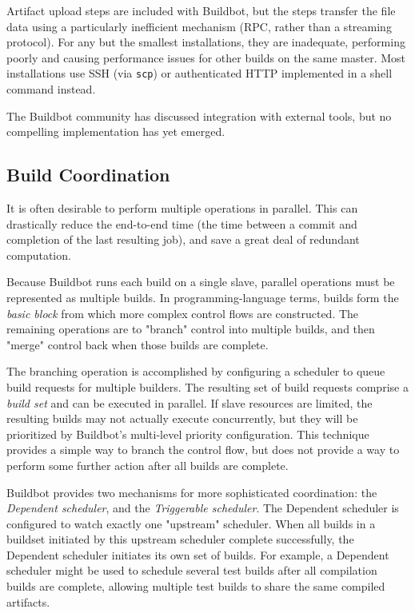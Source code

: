 \documentclass[conference]{IEEEtran}
\begin{document}
Artifact upload steps are included with Buildbot, but the steps transfer the file data using a particularly inefficient mechanism (RPC, rather than a streaming protocol).
For any but the smallest installations, they are inadequate, performing poorly and causing performance issues for other builds on the same master.
Most installations use SSH (via {\tt scp}) or authenticated HTTP implemented in a shell command instead.

The Buildbot community has discussed integration with external tools\cite{pull547}, but no compelling implementation has yet emerged.

\subsection{Build Coordination}

It is often desirable to perform multiple operations in parallel.
This can drastically reduce the end-to-end time (the time between a commit and completion of the last resulting job), and save a great deal of redundant computation.

Because Buildbot runs each build on a single slave, parallel operations must be represented as multiple builds.
In programming-language terms, builds form the \emph{basic block} from which more complex control flows are constructed.
The remaining operations are to "branch" control into multiple builds, and then "merge" control back when those builds are complete.

The branching operation is accomplished by configuring a scheduler to queue build requests for multiple builders.
The resulting set of build requests comprise a \emph{build set} and can be executed in parallel.
If slave resources are limited, the resulting builds may not actually execute concurrently, but they will be prioritized by Buildbot's multi-level priority configuration.
This technique provides a simple way to branch the control flow, but does not provide a way to perform some further action after all builds are complete.

Buildbot provides two mechanisms for more sophisticated coordination: the \emph{Dependent scheduler}, and the \emph{Triggerable scheduler}.
The Dependent scheduler is configured to watch exactly one "upstream" scheduler.
When all builds in a buildset initiated by this upstream scheduler complete successfully, the Dependent scheduler initiates its own set of builds.
For example, a Dependent scheduler might be used to schedule several test builds after all compilation builds are complete, allowing multiple test builds to share the same compiled artifacts.
\end{document}
